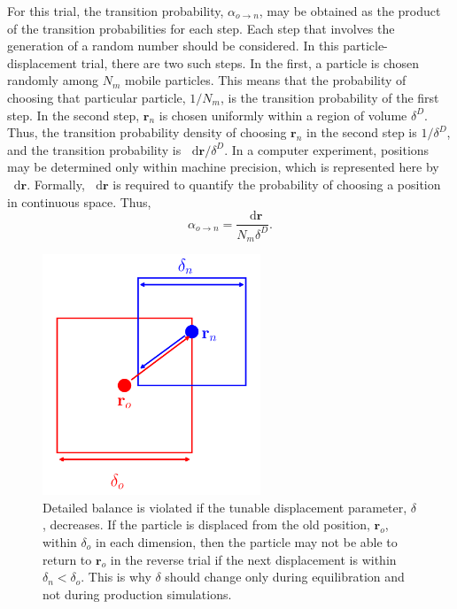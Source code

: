 \documentclass[
  9pt,
  bestpractices,
]{livecoms}
\newcommand*\diff{\mathop{}\!\mathrm{d}}
\begin{document}
For this trial, the transition probability, $\alpha_{o\rightarrow n}$, may be obtained as the product of the transition probabilities for each step.
Each step that involves the generation of a random number should be considered.
In this particle-displacement trial, there are two such steps.
In the first, a particle is chosen randomly among $N_m$ mobile particles.
This means that the probability of choosing that particular particle, $1/N_m$, is the transition probability of the first step.
In the second step, $\mathbf{r}_n$ is chosen uniformly within a region of volume $\delta^D$.
Thus, the transition probability density of choosing $\mathbf{r}_n$ in the second step is $1/\delta^D$, and the transition probability is $\diff\mathbf{r}/\delta^D$.
In a computer experiment, positions may be determined only within machine precision, which is represented here by $\diff\mathbf{r}$.
Formally, $\diff\mathbf{r}$ is required to quantify the probability of choosing a position in continuous space.
Thus,
\begin{equation}
\alpha_{o\rightarrow n} = \frac{\diff\mathbf{r}}{N_m \delta^D}.
\label{eq:lhs_disp_forward}
\end{equation}

\begin{figure}
\begin{centering}
\includegraphics[width=6.5cm]{../figures/lhs_nvt.png}
\caption{
Detailed balance is violated if the tunable displacement parameter, $\delta$, decreases.
If the particle is displaced from the old position, $\mathbf{r}_o$, within $\delta_o$ in each dimension, then the particle may not be able to return to $\mathbf{r}_o$ in the reverse trial if the next displacement is within $\delta_n<\delta_o$.
This is why $\delta$ should change only during equilibration and not during production simulations.
}
\label{fig:lhs_nvt}
\end{centering}
\end{figure}
\end{document}
